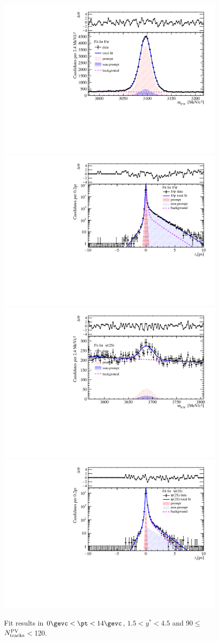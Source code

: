 \begin{figure}[H]
\begin{center}
\includegraphics[width=0.45\linewidth]{pdf/Pbp/Workdir/TwoDimFit/ProjMass/Jpsi_n4y1pt1.pdf}
\includegraphics[width=0.45\linewidth]{pdf/Pbp/Workdir/TwoDimFit/ProjTz/Jpsi_n4y1pt1.pdf}
\vspace*{-0.5cm}
\includegraphics[width=0.45\linewidth]{pdf/Pbp/Workdir/TwoDimFit/ProjMass/Psi2S_n4y1pt1.pdf}
\includegraphics[width=0.45\linewidth]{pdf/Pbp/Workdir/TwoDimFit/ProjTz/Psi2S_n4y1pt1.pdf}
\vspace*{-0.5cm}
\end{center}
\caption{Fit results in $0\gevc<\pt<14\gevc$, $1.5<y^*<4.5$ and 90$\leq$$N_{\rm tracks}^{\rm PV}$$<$120.}
\end{figure}
